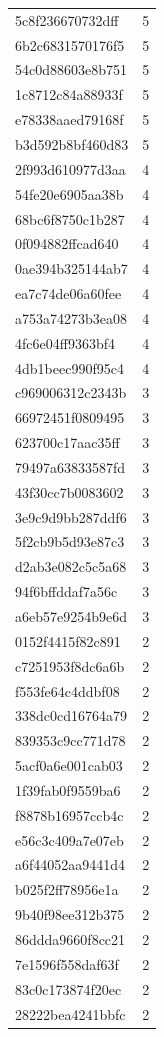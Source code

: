 \begin{tabular}{ll}
5c8f236670732dff & 5 \\
6b2c6831570176f5 & 5 \\
54c0d88603e8b751 & 5 \\
1c8712c84a88933f & 5 \\
e78338aaed79168f & 5 \\
b3d592b8bf460d83 & 5 \\
2f993d610977d3aa & 4 \\
54fe20e6905aa38b & 4 \\
68bc6f8750c1b287 & 4 \\
0f094882ffcad640 & 4 \\
0ae394b325144ab7 & 4 \\
ea7c74de06a60fee & 4 \\
a753a74273b3ea08 & 4 \\
4fc6e04ff9363bf4 & 4 \\
4db1beec990f95c4 & 4 \\
c969006312c2343b & 3 \\
66972451f0809495 & 3 \\
623700c17aac35ff & 3 \\
79497a63833587fd & 3 \\
43f30cc7b0083602 & 3 \\
3e9c9d9bb287ddf6 & 3 \\
5f2cb9b5d93e87c3 & 3 \\
d2ab3e082c5c5a68 & 3 \\
94f6bffddaf7a56c & 3 \\
a6eb57e9254b9e6d & 3 \\
0152f4415f82c891 & 2 \\
c7251953f8dc6a6b & 2 \\
f553fe64c4ddbf08 & 2 \\
338dc0cd16764a79 & 2 \\
839353c9cc771d78 & 2 \\
5acf0a6e001cab03 & 2 \\
1f39fab0f9559ba6 & 2 \\
f8878b16957ccb4c & 2 \\
e56c3c409a7e07eb & 2 \\
a6f44052aa9441d4 & 2 \\
b025f2ff78956e1a & 2 \\
9b40f98ee312b375 & 2 \\
86ddda9660f8cc21 & 2 \\
7e1596f558daf63f & 2 \\
83c0c173874f20ec & 2 \\
28222bea4241bbfc & 2 \\

\end{tabular}
